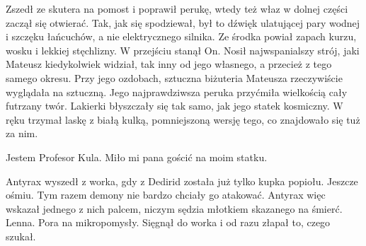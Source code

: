 Zszedł ze skutera na pomost i poprawił perukę, wtedy też właz w dolnej części zaczął się otwierać.
Tak, jak się spodziewał, był to dźwięk ulatującej pary wodnej i szczęku łańcuchów, a nie elektrycznego silnika.
Ze środka powiał zapach kurzu, wosku i lekkiej stęchlizny.
W przejściu stanął On.
Nosił najwspanialszy strój, jaki Mateusz kiedykolwiek widział, tak inny od jego własnego, a przecież z tego samego okresu.
Przy jego ozdobach, sztuczna biżuteria Mateusza rzeczywiście wyglądała na sztuczną.
Jego najprawdziwsza peruka przyćmiła wielkością cały futrzany twór.
Lakierki błyszczały się tak samo, jak jego statek kosmiczny.
W ręku trzymał laskę z białą kulką, pomniejszoną wersję tego, co znajdowało się tuż za nim.

\ds{} Jestem Profesor Kula. Miło mi pana gościć na moim statku. \de{}

\divider{}

Antyrax wyszedł z worka, gdy z Dedirid została już tylko kupka popiołu.
Jeszcze ośmiu.
Tym razem demony nie bardzo chciały go atakować.
Antyrax więc wskazał jednego z nich palcem, niczym sędzia młotkiem skazanego na śmierć.
Lenna. Pora na mikropomysły.
Sięgnął do worka i od razu złapał to, czego szukał.

\divider{}


















